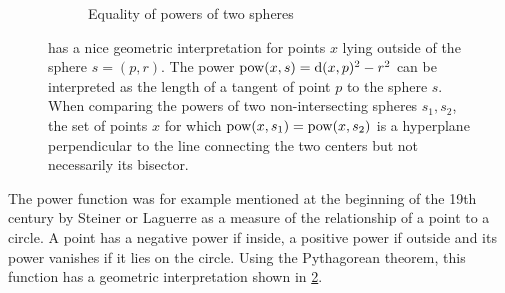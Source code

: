 \begin{figure}[tb]
\begin{subfigure}[b]{.55\linewidth}
        \caption{Equality of powers of two spheres}
        \label{sfig:chordal}
    \end{subfigure}
    \caption{ has a nice geometric interpretation for points $x$ lying outside of the sphere $s=(p, r)$. The power $\operatorname{pow}(x, s) = \operatorname{d}(x, p)^2 - r^2$ can be interpreted as the length of a tangent of point $p$ to the sphere $s$. When comparing the powers of two non-intersecting spheres $s_1, s_2$, the set of points $x$ for which $\operatorname{pow}(x, s_1) = \operatorname{pow}(x, s_2)$ is a hyperplane perpendicular to the line connecting the two centers but not necessarily its bisector.}
    \label{fig:power}
\end{figure}

The power function was for example mentioned at the beginning of the 19th century by Steiner \cite{steiner1881jacob} or Laguerre \cite{blaschke2013vorlesungen} as a measure of the relationship of a point to a circle.
A point has a negative power if inside, a positive power if outside and its power vanishes if it lies on the circle.
Using the Pythagorean theorem, this function has a geometric interpretation shown in \cref{fig:power}.


